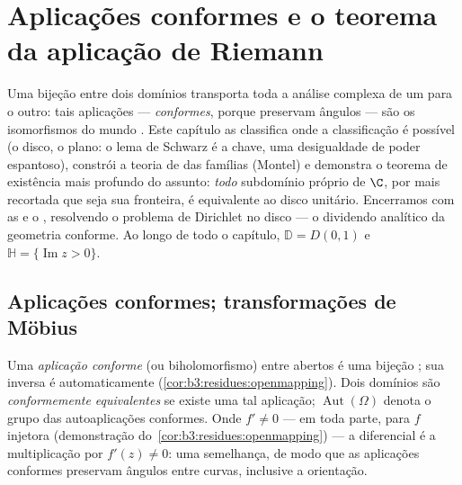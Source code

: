 \chapter{Aplicações conformes e o teorema da aplicação de Riemann}
\label{ch:b3:conformal}

Uma bijeção  entre dois domínios transporta toda a análise
complexa de um para o outro: tais aplicações --- \emph{conformes},
porque preservam ângulos --- são os isomorfismos do mundo .
Este capítulo as classifica onde a classificação é possível (o disco, o
plano: o lema de Schwarz é a chave, uma desigualdade de poder
espantoso), constrói a teoria de  das famílias 
(Montel) e demonstra o teorema de existência mais profundo do assunto:
\emph{todo} subdomínio próprio  de $\C$, por mais
recortada que seja sua fronteira, é  equivalente ao disco
unitário. Encerramos com as  e o ,
resolvendo o problema de Dirichlet no disco --- o dividendo analítico da
geometria conforme. Ao longo de todo o capítulo, $\mathbb D = D(0,1)$ e $\mathbb H = \{\operatorname{Im}z >
0\}$.

\section{Aplicações conformes; transformações de Möbius}

\begin{definition}\label{def:b3:conformal:conformal}
Uma \emph{aplicação conforme} (ou
biholomorfismo) entre abertos é uma bijeção ; sua inversa é
automaticamente  (\cref{cor:b3:residues:openmapping}). Dois domínios são
\emph{conformemente equivalentes} se existe uma tal aplicação; $\operatorname{Aut}(\Omega)$
denota o grupo das autoaplicações conformes. Onde $f' \neq 0$ --- em toda
parte, para $f$ injetora (demonstração do~\cref{cor:b3:residues:openmapping}) --- a
diferencial é a multiplicação por $f'(z) \neq 0$: uma semelhança, de modo que as
aplicações conformes preservam ângulos entre curvas, inclusive a
orientação.
\end{definition}


